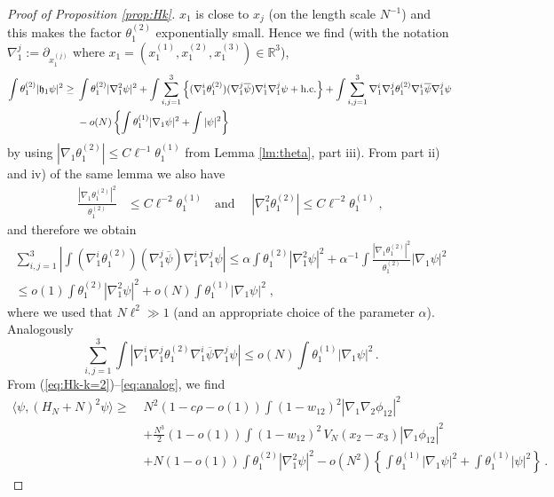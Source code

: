 \documentclass[11pt]{article}
\renewcommand{\a}{\alpha}
\newcommand{\bR}{{\mathbb R}}
\newcommand{\fh}{{\frak h}}
\begin{document}
\begin{proof}[Proof of Proposition \ref{prop:Hk}]
 $x_1$ is close to $x_j$ (on the length scale $N^{-1}$) and
this makes the factor $\theta_1^{(2)}$ exponentially small. Hence we
find  (with the notation
 $\nabla_1^j:=\partial_{x_1^{(j)}}$ where $x_1= (x_1^{(1)},
x_1^{(2)},x_1^{(3)})\in\bR^3$),
\begin{equation}\label{eq:H1^2}
\begin{split}
\int \theta_1^{(2)} |\fh_1 \psi|^2 \geq \; &\int  \theta_1^{(2)}
|\nabla_1^2 \psi|^2 + \int \sum_{i,j=1}^3 \left\{
(\nabla_1^i \theta_1^{(2)})
(\nabla_1^j \overline{\psi})
 \nabla_1^i\nabla_1^j \psi + \text{h.c.} \right\} +
\int \sum_{i,j=1}^3 \nabla_1^i\nabla_1^j \theta_1^{(2)}
\nabla_1^i \overline{\psi}\nabla_1^j\psi\, \\ &- o(N)
\left\{ \int \theta_1^{(1)} |\nabla_1 \psi|^2 + \int |\psi|^2
\right\}
\end{split}
\end{equation}
by using $|\nabla_1\theta_1^{(2)}|\leq C\ell^{-1}\theta_1^{(1)}$
from  Lemma \ref{lm:theta}, part iii).
{F}rom part ii) and iv) of the same lemma we also have
\begin{equation} \begin{split}
\frac{\left|\nabla_1 \theta_1^{(2)} \right|^2}{\theta_1^{(2)}} &\leq
C \ell^{-2} \theta_1^{(1)} \quad \text{and } \quad  \left|
\nabla^2_1 \theta_1^{(2)} \right| \leq C \ell^{-2} \theta_1^{(1)}\; ,
\end{split}
\end{equation}
and therefore we obtain
\begin{equation}
\begin{split}
\sum_{i,j=1}^3 \left|  \int
(\nabla_1^i \theta_1^{(2)})
(\nabla_1^j \overline{\psi})
 \nabla_1^i\nabla_1^j \psi \right|
\leq \a \int \theta_1^{(2)} |\nabla_1^2
\psi|^2 + \a^{-1} \int \frac{|\nabla_1
\theta_1^{(2)}|^2}{\theta_1^{(2)}} |\nabla_1 \psi|^2
\\ \leq o(1) \int \theta_1^{(2)} |\nabla_1^2 \psi|^2 + o(N) \int
\theta_1^{(1)} |\nabla_1 \psi|^2\; ,
\end{split}
\end{equation}
where we used that $N\ell^2 \gg 1$ (and an appropriate choice of the
parameter $\a$). Analogously
\begin{equation}\label{eq:analog}
\sum_{i,j=1}^3 \int \left| \nabla_1^i\nabla_1^j \theta_1^{(2)}
\nabla_1^i \overline{\psi}\nabla_1^j\psi\right|
 \leq o(N) \int
\theta_1^{(1)} |\nabla_1 \psi|^2\,.
\end{equation}
{F}rom (\ref{eq:Hk-k=2})--\eqref{eq:analog},
we find
\begin{equation}
\begin{split}
\langle \psi, (H_N+N)^2 \psi \rangle \geq  \;& N^2 (1-c\rho-o(1))
\int (1-w_{12})^2  |\nabla_1 \nabla_2 \phi_{12}|^2 \\
&+ \frac{N^3}{2} (1-o(1)) \int (1-w_{12})^2  \, V_N (x_2-x_3)
|\nabla_1 \phi_{12}|^2 \\ &+ N (1-o(1)) \int \theta_1^{(2)}
|\nabla_1^2 \psi|^2 - o(N^2) \left\{ \int \theta_1^{(1)} |\nabla_1
\psi|^2 + \int \theta_1^{(1)} |\psi|^2 \right\} \, .
\end{split}
\end{equation}



\end{proof}
\end{document}
